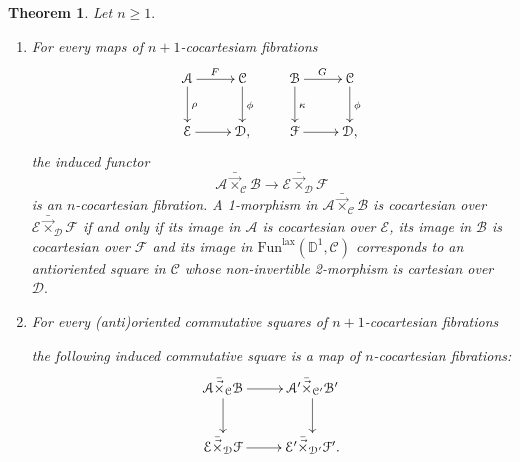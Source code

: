 \documentclass[10pt,oneside]{article}
\numberwithin{equation}{section} %
\numberwithin{figure}{section} %
\theoremstyle{plain}
\newtheorem{theorem}{Theorem}[subsection]
\theoremstyle{definition}
\newcommand{\bD}{{\mathbb D}}
\newcommand{\mA}{{\mathcal A}}
\newcommand{\mB}{{\mathcal B}}
\newcommand{\mC}{{\mathcal C}}
\newcommand{\mD}{{\mathcal D}}
\newcommand{\mE}{{\mathcal E}}
\newcommand{\mF}{{\mathcal F}}
\newcommand{\co}{\mathrm{co}}
\newcommand{\Fun}{\mathrm{Fun}}
\newcommand{\Cart}{{\mathrm{Cart}}}
\newcommand{\lax}{{\mathrm{lax}}}
\newcommand{\cube}{{\,\vline\negmedspace\square}}
\begin{document}
\begin{theorem}\label{laxfib} Let $n \geq 1. $

\begin{enumerate}[\normalfont(1)]\setlength{\itemsep}{-2pt}
\item For every maps of $n+1$-cocartesiam fibrations
\begin{equation}\label{degen}
\xymatrix{
\mA \ar[r]^F \ar[d]^\rho & \mC \ar[d]^\phi \\
\mE \ar[r] & \mD,
}
\qquad
\xymatrix{
\mB \ar[r]^G \ar[d]^\kappa & \mC \ar[d]^\phi \\
\mF \ar[r] & \mD,
}
\end{equation} the induced functor 
\begin{equation}\label{sqgj}
\mA {\bar{\vec{\times}}}_{\mC} \mB \to \mE {\bar{\vec{\times}}}_{\mD} \mF \end{equation}
is an $n$-cocartesian fibration.
A 1-morphism in $\mA {\bar{\vec{\times}}}_{\mC} \mB $ is cocartesian over $\mE {\bar{\vec{\times}}}_{\mD} \mF $ if and only if its image in $\mA$ is cocartesian over $\mE$, its image in $\mB$ is cocartesian over $\mF$ and its image in $\Fun^\lax(\bD^1,\mC)$
corresponds to an antioriented square in $\mC$ whose non-invertible 2-morphism is cartesian over $\mD.$

\item For every (anti)oriented commutative squares of $n+1$-cocartesian fibrations 

\qquad\qquad
{}
\qquad\qquad\qquad
{}


the following induced commutative square is a map of $n$-cocartesian fibrations:
\begin{equation}\label{sqty}
\xymatrix{
\mA {\bar{\vec{\times}}}_{\mC} \mB \ar[r] \ar[d] & \mA' {\bar{\vec{\times}}}_{\mC'} \mB' \ar[d] \\
\mE {\bar{\vec{\times}}}_{\mD} \mF \ar[r] & \mE' {\bar{\vec{\times}}}_{\mD'} \mF'.
}
\end{equation}
\end{enumerate}

\end{theorem}
\end{document}
